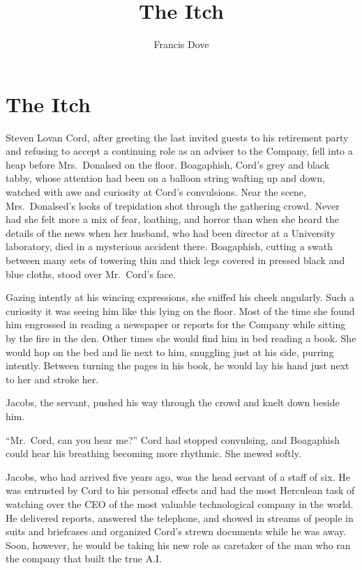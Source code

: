 \documentclass[
]{article}
\title{The Itch}
\author{Francis Dove}
\date{}
\begin{document}
\maketitle

\section{The Itch}\label{the-itch}

Steven Lovan Cord, after greeting the last invited guests to his
retirement party and refusing to accept a continuing role as an adviser
to the Company, fell into a heap before Mrs.~Donalsed on the floor.
Boagaphish, Cord's grey and black tabby, whose attention had been on a
balloon string wafting up and down, watched with awe and curiosity at
Cord's convulsions. Near the scene, Mrs.~Donalsed's looks of trepidation
shot through the gathering crowd. Never had she felt more a mix of fear,
loathing, and horror than when she heard the details of the news when
her husband, who had been director at a University laboratory, died in a
mysterious accident there. Boagaphish, cutting a swath between many sets
of towering thin and thick legs covered in pressed black and blue
cloths, stood over Mr.~Cord's face.

Gazing intently at his wincing expressions, she sniffed his cheek
angularly. Such a curiosity it was seeing him like this lying on the
floor. Most of the time she found him engrossed in reading a newspaper
or reports for the Company while sitting by the fire in the den. Other
times she would find him in bed reading a book. She would hop on the bed
and lie next to him, snuggling just at his side, purring intently.
Between turning the pages in his book, he would lay his hand just next
to her and stroke her.

Jacobs, the servant, pushed his way through the crowd and knelt down
beside him.

``Mr.~Cord, can you hear me?'' Cord had stopped convulsing, and
Boagaphish could hear his breathing becoming more rhythmic. She mewed
softly.

Jacobs, who had arrived five years ago, was the head servant of a staff
of six. He was entrusted by Cord to his personal effects and had the
most Herculean task of watching over the CEO of the most valuable
technological company in the world. He delivered reports, answered the
telephone, and showed in streams of people in suits and briefcases and
organized Cord's strewn documents while he was away. Soon, however, he
would be taking his new role as caretaker of the man who ran the company
that built the true A.I.
\end{document}

